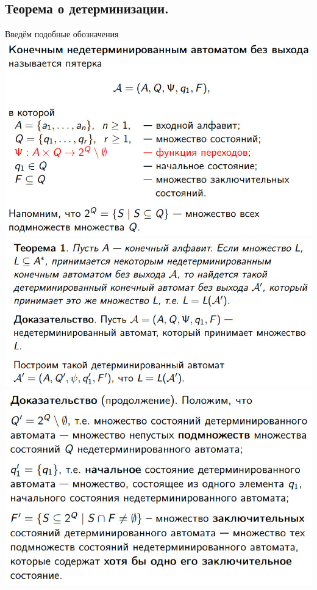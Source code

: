 \documentclass[12pt]{article}
\begin{document}
\subsection{Теорема о детерминизации.}
	Введём подобные обозначения\\
	\includegraphics[width=400pt]{53}\\
	\includegraphics[width=400pt]{54}\\
	\includegraphics[width=400pt]{55}\\
\end{document}
